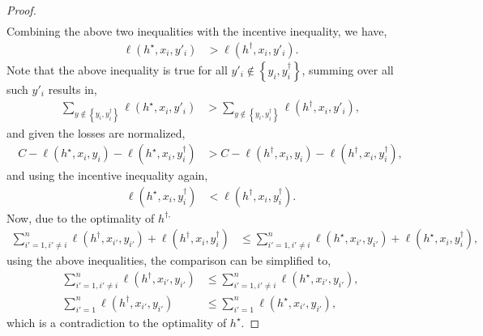 \documentclass{article}
\begin{document}
\begin{proof}
\begin{align*}
\end{align*}
Combining the above two inequalities with the incentive inequality, we have,
\begin{align*}
\ell\left(h^\star , x_{i}, y'_{i}\right) &> \ell\left(h^{\dagger}, x_{i}, y'_{i}\right).
\end{align*}
Note that the above inequality is true for all $y'_{i} \notin \left\{y_{i}, y^{\dagger}_{i}\right\}$, summing over all such $y'_{i}$ results in,
\begin{align*}
\displaystyle\sum_{y \notin \left\{y_{i}, y^{\dagger}_{i}\right\}} \ell\left(h^\star , x_{i}, y'_{i}\right) &> \displaystyle\sum_{y \notin \left\{y_{i}, y^{\dagger}_{i}\right\}} \ell\left(h^{\dagger}, x_{i}, y'_{i}\right),
\end{align*}
and given the losses are normalized,
\begin{align*}
C  - \ell\left(h^\star , x_{i}, y_{i}\right) - \ell\left(h^\star , x_{i}, y^{\dagger}_{i}\right) &> C  - \ell\left(h^{\dagger}, x_{i}, y_{i}\right) - \ell\left(h^{\dagger}, x_{i}, y^{\dagger}_{i}\right),
\end{align*}
and using the incentive inequality again,
\begin{align*}
\ell\left(h^\star , x_{i}, y^{\dagger}_{i}\right) &< \ell\left(h^{\dagger}, x_{i}, y^{\dagger}_{i}\right).
\end{align*}
Now, due to the optimality of $h^{\dagger,}$
\begin{align*}
\displaystyle\sum_{i'=1, i' \neq  i}^{n} \ell\left(h^{\dagger}, x_{i'}, y_{i'}\right) + \ell\left(h^{\dagger}, x_{i}, y^{\dagger}_{i}\right) &\leq  \displaystyle\sum_{i'=1, i' \neq  i}^{n} \ell\left(h^\star , x_{i'}, y_{i'}\right) + \ell\left(h^\star , x_{i}, y^{\dagger}_{i}\right),
\end{align*}
using the above inequalities, the comparison can be simplified to,
\begin{align*}
\displaystyle\sum_{i'=1, i' \neq  i}^{n} \ell\left(h^{\dagger}, x_{i'}, y_{i'}\right) &\leq  \displaystyle\sum_{i'=1, i' \neq  i}^{n} \ell\left(h^\star , x_{i'}, y_{i'}\right),
\\ \displaystyle\sum_{i'=1}^{n} \ell\left(h^{\dagger}, x_{i'}, y_{i'}\right) &\leq  \displaystyle\sum_{i'=1}^{n} \ell\left(h^\star , x_{i'}, y_{i'}\right),
\end{align*}
which is a contradiction to the optimality of $h^\star $.
\newline \newline\end{proof}


\end{document}
